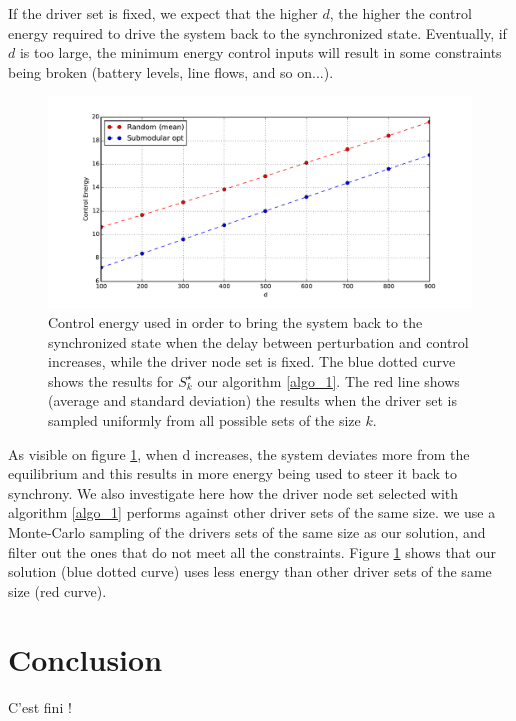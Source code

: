 \documentclass[conference]{IEEEtran}
\begin{document}
 If the driver set is fixed, we expect that the higher $ d$, the higher the control energy required to drive the system back to the synchronized state. Eventually, if $d$ is too large, the minimum energy control inputs will result in some constraints being broken (battery levels, line flows, and so on...).

\begin{figure}
\label{fig:energy_vs_delay}
\includegraphics[scale=.38]{energy_vs_delay2}
\caption{ Control energy used in order to bring the system back to the synchronized state when the delay between perturbation and control increases, while the driver node set is fixed. The blue dotted curve shows the results for $ S_k^{\star} $ our algorithm \ref{algo_1}. The red line shows (average and standard deviation) the results when the driver set is sampled uniformly from all possible sets of the size $ k $.}
\end{figure}

As visible on figure \ref{fig:energy_vs_delay}, when d increases, the system deviates more from the equilibrium and this results in more energy being used to steer it back to synchrony. We also investigate here how the driver node set selected with algorithm \ref{algo_1} performs against other driver sets of the same size. we use a Monte-Carlo sampling of the drivers sets of the same size as our solution, and filter out the ones that do not meet all the constraints. Figure \ref{fig:energy_vs_delay} shows that our solution (blue dotted curve) uses less energy than other driver sets of the same size (red curve).


\section{Conclusion}
\label{sec:Conclusion}
C'est fini !



  

\end{document}
